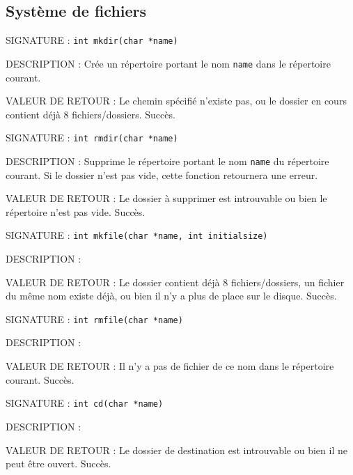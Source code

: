\documentclass{article}
\begin{document}
	\subsection{Système de fichiers}
		\begin{description}
			\item{SIGNATURE : } \texttt{int mkdir(char *name)}
			\item{DESCRIPTION : } Crée un répertoire portant le nom \texttt{name} dans le répertoire courant.
			\item{VALEUR DE RETOUR : } 
				 Le chemin spécifié n'existe pas, ou le dossier en cours contient déjà 8 fichiers/dossiers.
				 Succès.
		\end{description}
		\vspace{2.5mm}
		\begin{description}
			\item{SIGNATURE : } \texttt{int rmdir(char *name)}
			\item{DESCRIPTION : } Supprime le répertoire portant le nom \texttt{name} du répertoire courant. Si le dossier n'est pas vide, cette fonction retournera une erreur.
			\item{VALEUR DE RETOUR : } 
				 Le dossier à supprimer est introuvable ou bien le répertoire n'est pas vide.
				\subitem{\texttt{1} : } Succès.
		\end{description}
		\vspace{2.5mm}
		\begin{description}
			\item{SIGNATURE : } \texttt{int mkfile(char *name, int initialsize)}
			\item{DESCRIPTION : } 
			\item{VALEUR DE RETOUR : } 
				 Le dossier contient déjà 8 fichiers/dossiers, un fichier du même nom existe déjà, ou bien il n'y a plus de place sur le disque.
				 Succès.
		\end{description}
		\vspace{2.5mm}
		\begin{description}
			\item{SIGNATURE : } \texttt{int rmfile(char *name)}
			\item{DESCRIPTION : } 
			\item{VALEUR DE RETOUR : } 
				 Il n'y a pas de fichier de ce nom dans le répertoire courant.
				\subitem{\texttt{1} : } Succès.
		\end{description}
		\vspace{2.5mm}
		\begin{description}
			\item{SIGNATURE : } \texttt{int cd(char *name)}
			\item{DESCRIPTION : } 
			\item{VALEUR DE RETOUR : } 
				 Le dossier de destination est introuvable ou bien il ne peut être ouvert.
				 Succès.
		\end{description}
		\vspace{2.5mm}
	
\end{document}
